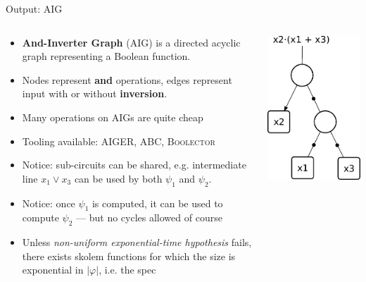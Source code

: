 \documentclass[aspectratio=169]{beamer}
\begin{document}
\begin{frame}{Output: AIG}
\begin{columns}
\begin{column}{0.68\textwidth}
\begin{itemize}
    \item \textbf{And-Inverter Graph} (AIG) is a directed acyclic graph
        representing a Boolean function.
    \item Nodes represent \textbf{and} operations, edges represent
        input with or without \textbf{inversion}.
    \item Many operations on AIGs are quite cheap
    \item Tooling available: \textsc{AIGER, ABC, Boolector}
    \item Notice: sub-circuits can be shared, e.g. intermediate line $x_1 \lor
        x_3$ can be used by both $\psi_1$ and $\psi_2$.
    \item Notice: once $\psi_1$ is computed, it can be used to compute $\psi_2$
        --- but no cycles allowed of course
    \item Unless \emph{non-uniform exponential-time hypothesis} fails, there
        exists skolem functions for which the size is exponential in $|\varphi|$,
        i.e. the spec
\end{itemize}
\end{column}
\begin{column}{0.28\textwidth}
\begin{center}
\includegraphics[scale=0.6]{And-inverter-graph.pdf}
\end{center}
\end{column}
\end{columns}
\end{frame}
\end{document}
